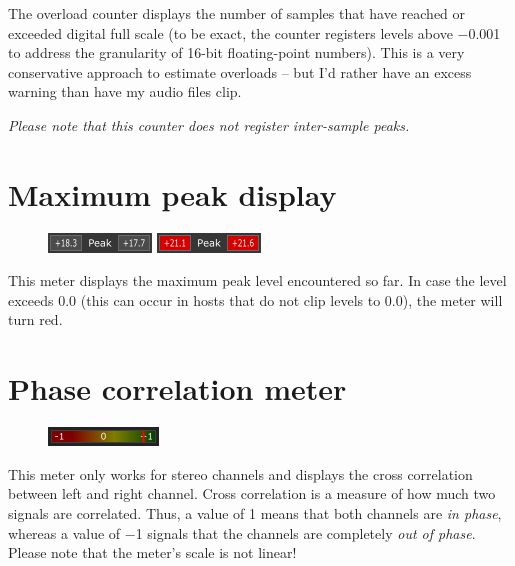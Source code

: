 The overload counter displays the number of samples that have reached
or exceeded digital full scale (to be exact, the counter registers
levels above \SI{-0.001}{\dBFS} to address the granularity of
\num{16}-bit floating-point numbers).  This is a very conservative
approach to estimate overloads -- but I'd rather have an excess
warning than have my audio files clip.

\emph{Please note that this counter does not register inter-sample
  peaks.}

\section{Maximum peak display}

\begin{figure}
  \includegraphics[scale=\screenshotscale,clip]{include/images/maximum_peak_normal.png}
  \newline \vspace{-0.9\baselineskip}
  \includegraphics[scale=\screenshotscale,clip]{include/images/maximum_peak_clipped.png}
\end{figure}

This meter displays the maximum peak level encountered so far.  In
case the level exceeds \SI{0.0}{\dBFS} (this can occur in hosts that
do not clip levels to \SI{0.0}{\dBFS}), the meter will turn red.

\section{Phase correlation meter}

\begin{figure}
  \includegraphics[scale=\screenshotscale,clip]{include/images/phase_correlation_meter.png}
\end{figure}

This meter only works for stereo channels and displays the cross
correlation between left and right channel.  Cross correlation is a
measure of how much two signals are correlated.  Thus, a value of
\num[retainplus]{+1} means that both channels are \emph{in phase},
whereas a value of \num{-1} signals that the channels are completely
\emph{out of phase}.  Please note that the meter's scale is not
linear!

